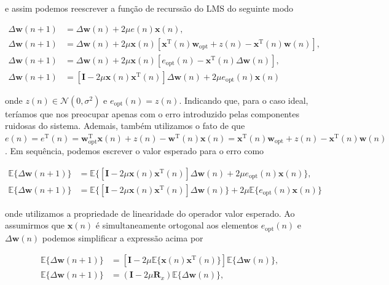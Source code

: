 \documentclass[a4paper,10pt]{article}
\begin{document}
\begin{enumerate}
\begin{enumerate}
						e assim podemos reescrever a função de recurssão do LMS do seguinte modo

						\begin{align}
							\Delta \mathbf{w}(n + 1) &= \Delta \mathbf{w}(n) + 2 \mu e(n) \mathbf{x}(n), \\
							\Delta \mathbf{w}(n + 1) &= \Delta \mathbf{w}(n) + 2 \mu \mathbf{x}(n) \left[\mathbf{x}^{\text{T}}(n)\mathbf{w}_{\text{opt}} + z(n) - \mathbf{x}^{\text{T}}(n)\mathbf{w}(n)\right], \\
							\Delta \mathbf{w}(n + 1) &= \Delta \mathbf{w}(n) + 2 \mu \mathbf{x}(n) \left[e_{\text{opt}}(n) - \mathbf{x}^{\text{T}}(n) \Delta \mathbf{w}(n)\right], \\
							\Delta \mathbf{w}(n + 1) &= \left[ \mathbf{I} - 2 \mu \mathbf{x}(n) \mathbf{x}^{\text{T}}(n) \right] \Delta \mathbf{w}(n) + 2 \mu e_{\text{opt}}(n) \mathbf{x}(n)
						\end{align}
					
						onde $z(n) \in \mathcal{N}(0,\sigma^{2})$ e $e_{\text{opt}}(n) = z(n)$. Indicando que, para o caso ideal, teríamos que nos preocupar apenas com o erro introduzido pelas componentes ruidosas do sistema.
						Ademais, também utilizamos o fato de que $e(n) = e^{\text{T}}(n) = \mathbf{w}^{\text{T}}_{\text{opt}}\mathbf{x}(n) + z(n) - \mathbf{w}^{\text{T}}(n)\mathbf{x}(n) = \mathbf{x}^{\text{T}}(n)\mathbf{w}_{\text{opt}} + z(n) - \mathbf{x}^{\text{T}}(n)\mathbf{w}(n)$.
						Em sequência, podemos escrever o valor esperado para o erro como

						\begin{align}
							\mathbb{E}\{\Delta \mathbf{w}(n + 1)\} &= \mathbb{E}\{\left[ \mathbf{I} - 2 \mu \mathbf{x}(n) \mathbf{x}^{\text{T}}(n) \right] \Delta \mathbf{w}(n) + 2 \mu e_{\text{opt}}(n) \mathbf{x}(n)\}, \\
							\mathbb{E}\{\Delta \mathbf{w}(n + 1)\} &= \mathbb{E}\{\left[ \mathbf{I} - 2 \mu \mathbf{x}(n) \mathbf{x}^{\text{T}}(n) \right] \Delta \mathbf{w}(n)\} + 2 \mu \mathbb{E}\{e_{\text{opt}}(n) \mathbf{x}(n)\}
						\end{align}
						
						onde utilizamos a propriedade de linearidade do operador valor esperado. Ao assumirmos que $\mathbf{x}(n)$ é simultaneamente ortogonal aos elementos $e_{\text{opt}}(n)$ e $\Delta \mathbf{w}(n)$ podemos simplificar a expressão acima por
						
						\begin{align}
							\mathbb{E}\{\Delta \mathbf{w}(n + 1)\} &= \left[ \mathbf{I} - 2 \mu \mathbb{E}\{\mathbf{x}(n) \mathbf{x}^{\text{T}}(n)\} \right] \mathbb{E}\{\Delta \mathbf{w}(n)\}, \\
							\mathbb{E}\{\Delta \mathbf{w}(n + 1)\} &= \left( \mathbf{I} - 2 \mu \mathbf{R}_{x} \right) \mathbb{E}\{\Delta \mathbf{w}(n)\},
						\end{align}


\end{enumerate}
\end{enumerate}
\end{document}

